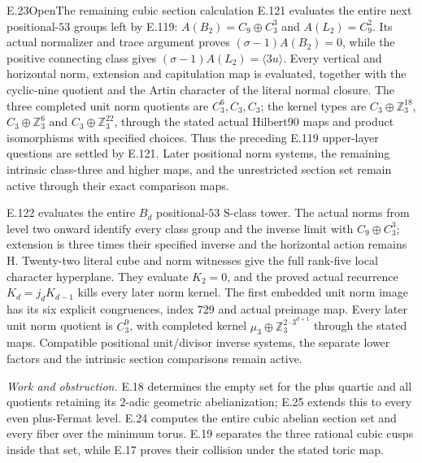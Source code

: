 \begin{statement}{E.23}{Open}{The remaining cubic section calculation}
E.121 evaluates the entire next positional-$53$ groups left
by E.119: $A(B_2)=C_9\oplus C_3^3$ and $A(L_2)=C_9^2$.
Its actual normalizer and trace argument proves
$(\sigma-1)A(B_2)=0$, while the positive connecting class
gives $(\sigma-1)A(L_2)=\langle3u\rangle$.
Every vertical and horizontal norm, extension and capitulation
map is evaluated, together with the cyclic-nine quotient and
the Artin character of the literal normal closure.
The three completed unit norm quotients are $C_3^6,C_3,C_3$;
the kernel types are $C_3\oplus\mathbb Z_3^{18}$,
$C_3\oplus\mathbb Z_3^6$ and
$C_3\oplus\mathbb Z_3^{22}$, through the stated actual
Hilbert90 maps and product isomorphisms with specified choices.
Thus the preceding E.119 upper-layer questions are settled
by E.121. Later positional norm systems, the remaining
intrinsic class-three and higher maps, and the unrestricted
section set remain active through their exact comparison maps.

E.122 evaluates the entire $B_d$ positional-$53$ S-class tower.
The actual norms from level two onward identify every class group
and the inverse limit with $C_9\oplus C_3^3$; extension is three
times their specified inverse and the horizontal action remains H.
Twenty-two literal cube and norm witnesses give the full rank-five
local character hyperplane. They evaluate $K_2=0$, and the proved
actual recurrence $K_d=j_dK_{d-1}$ kills every later norm kernel.
The first embedded unit norm image has its six explicit congruences,
index $729$ and actual preimage map. Every later unit norm quotient
is $C_3^9$, with completed kernel
$\mu_3\oplus\mathbb Z_3^{2\cdot3^{d+1}}$ through the stated maps.
Compatible positional unit/divisor inverse systems, the separate
lower factors and the intrinsic section comparisons remain active.
\end{statement}
\noindent\emph{Work and obstruction.}
E.18 determines the empty set for the plus quartic and all
quotients retaining its $2$-adic geometric abelianization;
E.25 extends this to every even plus-Fermat level. E.24 computes
the entire cubic abelian section set and every fiber over the
minimum torus. E.19 separates the three rational cubic cusps
inside that set, while E.17 proves their collision under the
stated toric map.

